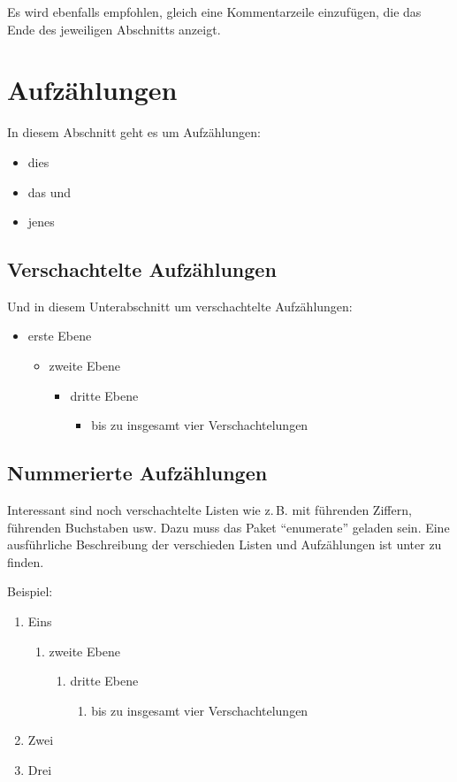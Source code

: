 \documentclass[12pt,	%
				headings=small,		%
				toc=bibliography,	%
			]	%
{scrreprt}		%
\begin{document}
	Es wird ebenfalls empfohlen, gleich eine Kommentarzeile einzufügen, die das Ende des jeweiligen Abschnitts anzeigt.

	\newpage

	\section{Aufzählungen} 
	\label{sec:aufzaehlungen}
		In diesem Abschnitt geht es um Aufzählungen:
		\begin{itemize}
			\item dies
			\item das und
			\item jenes
		\end{itemize}
		\subsection{Verschachtelte Aufzählungen}
		\label{sub:aufzaehlungVerschachtelt}
			Und in diesem Unterabschnitt um verschachtelte Aufzählungen:
			\begin{itemize}
				\item erste Ebene
				\begin{itemize}
					\item zweite Ebene
					\begin{itemize}
						\item dritte Ebene
						\begin{itemize}
							\item bis zu insgesamt vier Verschachtelungen
						\end{itemize}
					\end{itemize}
				\end{itemize}
			\end{itemize}
			\subsection{Nummerierte Aufzählungen}
			\label{sub:nummerAufzaehlung}
			Interessant sind  noch verschachtelte Listen wie z.\,B. mit führenden Ziffern, führenden Buchstaben usw. Dazu muss das Paket \enquote{enumerate} geladen sein. Eine ausführliche Beschreibung der verschieden Listen und Aufzählungen ist unter \autocite{enumerate} zu finden. 

			Beispiel:
			\begin{enumerate}
				\item Eins 
				\begin{enumerate}
					\item zweite Ebene
					\begin{enumerate}
						\item dritte Ebene
						\begin{enumerate}
							\item bis zu insgesamt vier Verschachtelungen
						\end{enumerate}
					\end{enumerate}
				\end{enumerate}
				\item Zwei 
				\item Drei 				
			\end{enumerate}
\end{document}
